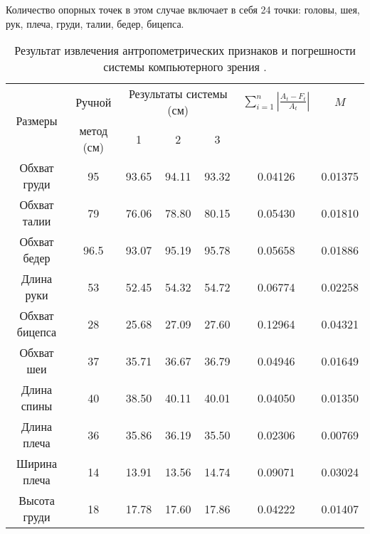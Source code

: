Количество опорных точек в этом случае включает в себя 24 точки: головы, шея, рук, плеча, груди, талии, бедер, бицепса. 

\begin{table}[b!]%
\begin{center}
\caption{Результат извлечения антропометрических признаков и погрешности системы компьютерного зрения \cite{long1,long2}.}\label{tab1}
  \begin{tabular}{|c|c|c|c|c|c|c|}
    \hline
    \multirow{2}{*}{Размеры} & {Ручной} & \multicolumn{3}{c}{Результаты системы (см)} & {$\sum^n_{i=1}\left|\frac{A_t-F_t}{A_t}\right|$} &{$M$} \\
      & метод (см) &1 &2 &3& & \\
    \hline
Обхват груди &95	&93.65	&94.11	&93.32	&0.04126	&0.01375\\
\hline
Обхват талии               &79	&76.06	&78.80	&80.15	&0.05430	&0.01810\\
\hline
Обхват бедер              &96.5	&93.07	&95.19	&95.78	&0.05658	&0.01886\\
\hline
Длина руки           &53	  &52.45	&54.32	&54.72	&0.06774	&0.02258\\
\hline
Обхват бицепса      &28	 &25.68	  &27.09	&27.60	&0.12964	&0.04321\\
\hline
Обхват шеи          &37	 &35.71	  &36.67	&36.79	&0.04946	&0.01649\\
\hline
Длина спины         &40	 &38.50	  &40.11	&40.01	&0.04050	&0.01350\\
\hline
Длина плеча       &36	 &35.86	  &36.19	&35.50	&0.02306	&0.00769\\
\hline
Ширина плеча         &14	 &13.91	  &13.56	&14.74	&0.09071	&0.03024\\
\hline
Высота груди        &18	 &17.78	  &17.60	&17.86	&0.04222	&0.01407\\
\hline
  \end{tabular}
\end{center}
\end{table}%

